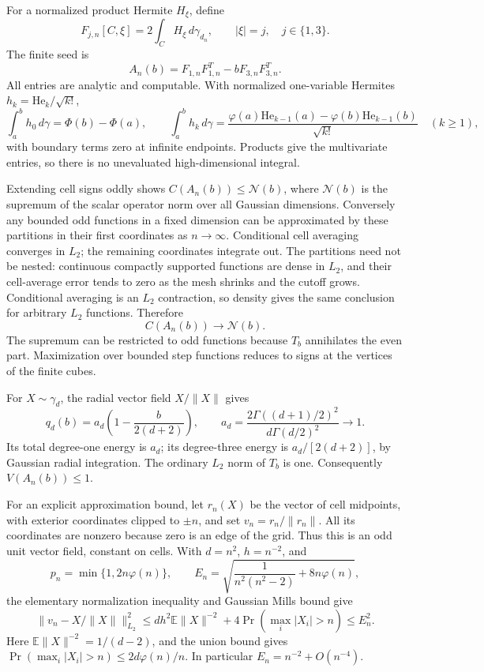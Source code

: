 \documentclass[11pt]{article}
\newcommand{\E}{\mathbb E}
\newcommand{\norm}[1]{\lVert #1\rVert}
\newcommand{\N}{\mathcal N}
\begin{document}
For a normalized product Hermite $H_\xi$, define
\[
 F_{j,n}[C,\xi]=2\int_C H_\xi\,d\gamma_{d_n},\qquad |\xi|=j,
 \quad j\in\{1,3\}.
\]
The finite seed is
\begin{equation}\label{eq:seed}
 A_n(b)=F_{1,n}F_{1,n}^T-bF_{3,n}F_{3,n}^T.
\end{equation}
All entries are analytic and computable. With normalized one-variable
Hermites $h_k=\mathrm{He}_k/\sqrt{k!}$,
\[
 \int_a^b h_0\,d\gamma=\Phi(b)-\Phi(a),\qquad
 \int_a^b h_k\,d\gamma
 =\frac{\varphi(a)\mathrm{He}_{k-1}(a)
       -\varphi(b)\mathrm{He}_{k-1}(b)}{\sqrt{k!}}\quad(k\ge1),
\]
with boundary terms zero at infinite endpoints. Products give the
multivariate entries, so there is no unevaluated high-dimensional integral.

Extending cell signs oddly shows $C(A_n(b))\le\N(b)$, where
$\N(b)$ is the supremum of the scalar operator norm over all Gaussian
dimensions. Conversely any bounded odd functions in a fixed dimension
can be approximated by these partitions in their first coordinates as
$n\to\infty$. Conditional cell averaging converges in $L_2$; the
remaining coordinates integrate out. The partitions need not be nested:
continuous compactly supported functions are dense in $L_2$, and their
cell-average error tends to zero as the mesh shrinks and the cutoff grows.
Conditional averaging is an $L_2$ contraction, so density gives the same
conclusion for arbitrary $L_2$ functions. Therefore
\begin{equation}\label{eq:classical-limit}
 C(A_n(b))\longrightarrow\N(b).
\end{equation}
The supremum can be restricted to odd functions because $T_b$ annihilates
the even part. Maximization over bounded step functions reduces to signs
at the vertices of the finite cubes.

For $X\sim\gamma_d$, the radial vector field $X/\norm X$ gives
\begin{equation}\label{eq:radial}
 q_d(b)=a_d\left(1-\frac{b}{2(d+2)}\right),\qquad
 a_d=\frac{2\Gamma((d+1)/2)^2}{d\Gamma(d/2)^2}
 \longrightarrow1.
\end{equation}
Its total degree-one energy is $a_d$; its degree-three energy is
$a_d/[2(d+2)]$, by Gaussian radial integration. The ordinary $L_2$
norm of $T_b$ is one. Consequently $V(A_n(b))\le1$.

For an explicit approximation bound, let $r_n(X)$ be the vector of
cell midpoints, with exterior coordinates clipped to $\pm n$, and set
$v_n=r_n/\|r_n\|$. All its coordinates are nonzero because zero is an
edge of the grid. Thus this is an odd unit vector field, constant on cells.
With $d=n^2$, $h=n^{-2}$, and
\[
 p_n=\min\{1,2n\varphi(n)\},\qquad
 E_n=\sqrt{\frac1{n^2(n^2-2)}+8n\varphi(n)},
\]
the elementary normalization inequality and Gaussian Mills bound give
\begin{equation}\label{eq:direction-error}
 \|v_n-X/\|X\|\|_{L_2}^2
 \le dh^2\E\|X\|^{-2}+4\Pr(\max_i|X_i|>n)
 \le E_n^2.
\end{equation}
Here $\E\|X\|^{-2}=1/(d-2)$, and the union bound gives
$\Pr(\max_i|X_i|>n)\le2d\varphi(n)/n$.
In particular $E_n=n^{-2}+O(n^{-4})$.
\end{document}
